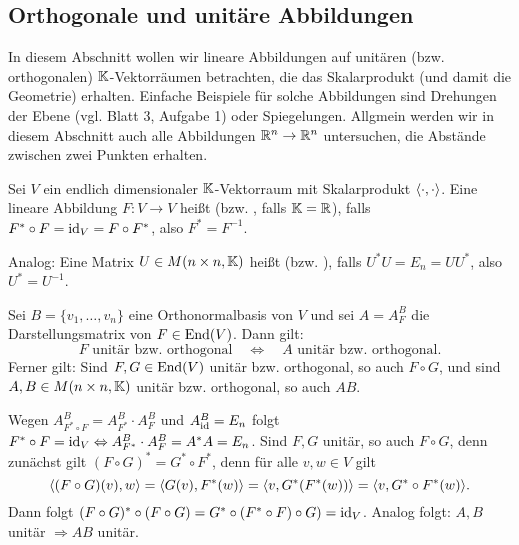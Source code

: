 \subsection{Orthogonale und unitäre Abbildungen}
\label{sec:2.6}

In diesem Abschnitt wollen wir lineare Abbildungen auf unitären (bzw. orthogonalen) $\mathbb{K}$-Vektorräumen betrachten, die das Skalarprodukt (und damit die Geometrie) erhalten.
Einfache Beispiele für solche Abbildungen sind Drehungen der Ebene (vgl. Blatt 3, Aufgabe 1) oder Spiegelungen.
Allgmein werden wir in diesem Abschnitt auch alle Abbildungen $\mathbb{R}^n \rightarrow \mathbb{R}^n$ untersuchen, die Abstände zwischen zwei Punkten erhalten.

\begin{definition}
	\label{def:6.1}
	Sei $V$ ein endlich dimensionaler $\mathbb{K}$-Vektorraum mit Skalarprodukt $\left\langle\cdot,\cdot\right\rangle$.
	Eine lineare Abbildung $F \colon V \rightarrow V$ heißt  (bzw. , falls $\mathbb{K}= \mathbb{R}$), falls $F^* \circ F = \operatorname{id}_V = F \circ F^*$, also $F^* = F^{-1}$.
	
	Analog: Eine Matrix $U \in M(n \times n,\mathbb{K})$ heißt  (bzw. ), falls $U^*U = E_n = UU^*$, also $U^* = U^{-1}$.
\end{definition}

\begin{lemma}
	\label{lemma:6.2}
	Sei $B = \{v_1,\dots,v_n\}$ eine Orthonormalbasis von $V$ und sei $A = A^B_F$ die Darstellungsmatrix von $F \in \operatorname{End}(V)$.
	Dann gilt: 
	\[
		F \text{ unitär bzw. orthogonal} \quad \Leftrightarrow \quad A \text{ unitär bzw. orthogonal}.
	\]
	Ferner gilt:
	Sind $F,G \in \operatorname{End}(V)$ unitär bzw. orthogonal, so auch $F \circ G$, und sind $A,B \in M(n \times n, \mathbb{K})$ unitär bzw. orthogonal, so auch $AB$.
\end{lemma}

\begin{beweis}
	Wegen $A_{F^* \circ F}^B = A_{F^*}^B \cdot A_F^B$ und $A_{\operatorname{id}}^B = E_n$ folgt $F^* \circ F = \operatorname{id}_V \Leftrightarrow A_{F^*}^B \cdot A_F^B = A^*A = E_n$.
	Sind $F,G$ unitär, so auch $F \circ G$, denn zunächst gilt $(F \circ G)^* = G^* \circ F^*$, denn für alle $v,w \in V$ gilt
	\[
		\sk{(F \circ G)(v),w} = \sk{G(v),F^*(w)} = \sk{v,G^*(F^*(w))} = \sk{v,G^*\circ F^*(w)}.
	\]
	Dann folgt $(F \circ G)^* \circ (F \circ G) = G^* \circ (F^* \circ F) \circ G ) = \operatorname{id}_V$.
	Analog folgt: $A,B$ unitär $\Rightarrow AB$ unitär. 
\end{beweis}

